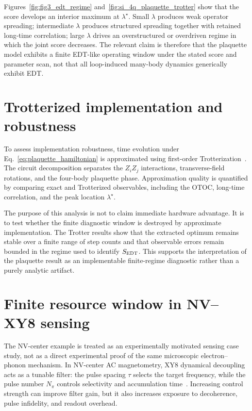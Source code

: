 \documentclass[
  prx,
  reprint,
  superscriptaddress,
  amsmath,
  amssymb,
  aps
]{revtex4-2}
\begin{document}
Figures~\ref{fig:fig3_edt_regime} and~\ref{fig:si_4q_plaquette_trotter} show that the score develops an interior maximum at $\lambda^\star$. Small $\lambda$ produces weak operator spreading; intermediate $\lambda$ produces structured spreading together with retained long-time correlation; large $\lambda$ drives an overstructured or overdriven regime in which the joint score decreases. The relevant claim is therefore that the plaquette model exhibits a finite EDT-like operating window under the stated score and parameter scan, not that all loop-induced many-body dynamics generically exhibit EDT.

\section{Trotterized implementation and robustness}

To assess implementation robustness, time evolution under Eq.~\eqref{eq:plaquette_hamiltonian} is approximated using first-order Trotterization~\cite{Trotter1959,Suzuki1990,Lloyd1996,Childs2019}. The circuit decomposition separates the $Z_iZ_j$ interactions, transverse-field rotations, and the four-body plaquette phase. Approximation quality is quantified by comparing exact and Trotterized observables, including the OTOC, long-time correlation, and the peak location $\lambda^\star$.

The purpose of this analysis is not to claim immediate hardware advantage. It is to test whether the finite diagnostic window is destroyed by approximate implementation. The Trotter results show that the extracted optimum remains stable over a finite range of step counts and that observable errors remain bounded in the regime used to identify $S_{\rm EDT}$. This supports the interpretation of the plaquette result as an implementable finite-regime diagnostic rather than a purely analytic artifact.

\section{Finite resource window in NV--XY8 sensing}

The NV-center example is treated as an experimentally motivated sensing case study, not as a direct experimental proof of the same microscopic electron--phonon mechanism. In NV-center AC magnetometry, XY8 dynamical decoupling acts as a tunable filter: the pulse spacing $\tau$ selects the target frequency, while the pulse number $N_\pi$ controls selectivity and accumulation time~\cite{Degen2017,Barry2020,Casola2018}. Increasing control strength can improve filter gain, but it also increases exposure to decoherence, pulse infidelity, and readout overhead.
\end{document}
